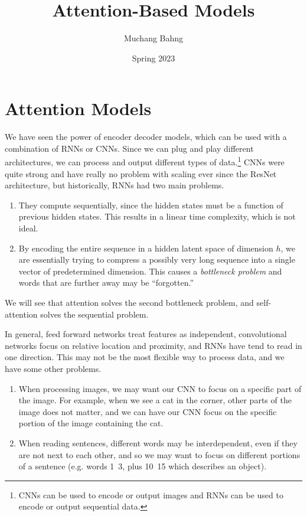 \documentclass{article}
\begin{document}

\title{Attention-Based Models}
\author{Muchang Bahng}
\date{Spring 2023}

\maketitle
\tableofcontents
\pagebreak 




\section{Attention Models}

  We have seen the power of encoder decoder models, which can be used with a combination of RNNs or CNNs. Since we can plug and play different architectures, we can process and output different types of data.\footnote{CNNs can be used to encode or output images and RNNs can be used to encode or output sequential data.} CNNs were quite strong and have really no problem with scaling ever since the ResNet architecture, but historically, RNNs had two main problems. 
  \begin{enumerate} 
    \item They compute sequentially, since the hidden states must be a function of previous hidden states. This results in a linear time complexity, which is not ideal. 
    \item By encoding the entire sequence in a hidden latent space of dimension $h$, we are essentially trying to compress a possibly very long sequence into a single vector of predetermined dimension. This causes a \textit{bottleneck problem} and words that are further away may be ``forgotten.''
  \end{enumerate}

  We will see that attention solves the second bottleneck problem, and self-attention solves the sequential problem. 

  In general, feed forward networks treat features as independent, convolutional networks focus on relative location and proximity, and RNNs have tend to read in one direction. This may not be the most flexible way to process data, and we have some other problems. 
  \begin{enumerate}
      \item When processing images, we may want our CNN to focus on a specific part of the image. For example, when we see a cat in the corner, other parts of the image does not matter, and we can have our CNN focus on the specific portion of the image containing the cat. 
      \item When reading sentences, different words may be interdependent, even if they are not next to each other, and so we may want to focus on different portions of a sentence (e.g. words 1~3, plus 10~15 which describes an object). 
  \end{enumerate}
\end{document}

